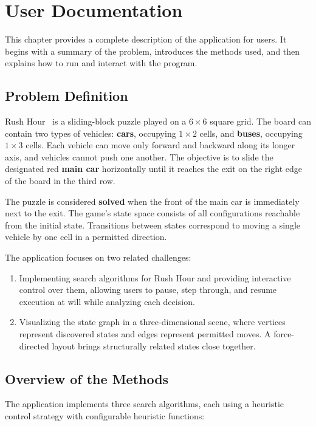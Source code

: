\chapter{User Documentation}
\label{ch:user}

This chapter provides a complete description of the application for users. It begins with a summary of the problem, introduces the methods used, and then explains how to run and interact with the program.

\section{Problem Definition}

Rush Hour~\cite{rushhour_puzzle} is a sliding-block puzzle played on a $6 \times 6$ square grid. The board can contain two types of vehicles: \textbf{cars}, occupying $1 \times 2$ cells, and \textbf{buses}, occupying $1 \times 3$ cells. Each vehicle can move only forward and backward along its longer axis, and vehicles cannot push one another. The objective is to slide the designated red \textbf{main car} horizontally until it reaches the exit on the right edge of the board in the third row.

The puzzle is considered \textbf{solved} when the front of the main car is immediately next to the exit. The game's state space consists of all configurations reachable from the initial state. Transitions between states correspond to moving a single vehicle by one cell in a permitted direction.

The application focuses on two related challenges:
\begin{enumerate}
    \item Implementing search algorithms for Rush Hour and providing interactive control over them, allowing users to pause, step through, and resume execution at will while analyzing each decision.
    \item Visualizing the state graph in a three-dimensional scene, where vertices represent discovered states and edges represent permitted moves. A force-directed layout brings structurally related states close together.
\end{enumerate}

\section{Overview of the Methods}

The application implements three search algorithms, each using a heuristic control strategy with configurable heuristic functions:

